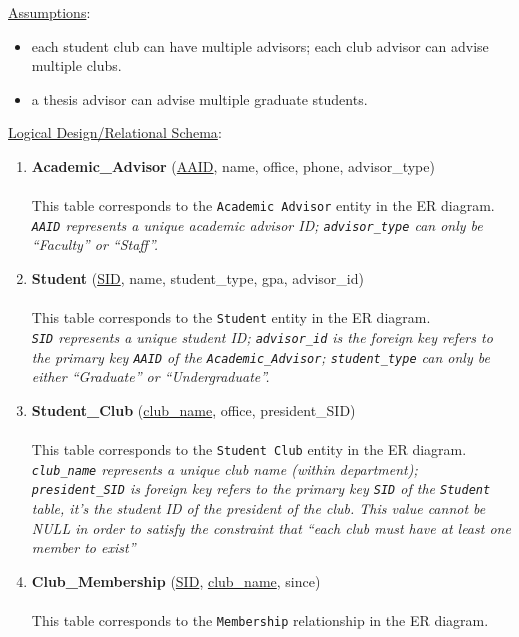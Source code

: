 \documentclass[10pt]{article}
\begin{document}
\underline{Assumptions}:
\begin{itemize}
\item each student club can have multiple advisors; each club advisor
  can advise multiple clubs.
\item a thesis advisor can advise multiple graduate students.
\end{itemize}

\vspace{1em}
\underline{Logical Design/Relational Schema}:

\begin{enumerate}
\item \textbf{Academic\_Advisor} (\underline{AAID}, name, office,
  phone, advisor\_type)\\\\
  This table corresponds to the \texttt{Academic Advisor} entity in
  the ER diagram.\\
  \emph{\texttt{AAID} represents a unique academic advisor ID;
    \texttt{advisor\_type} can only be ``Faculty'' or ``Staff''.}

\item \textbf{Student} (\underline{SID}, name, student\_type, gpa,
  advisor\_id)\\\\
  This table corresponds to the \texttt{Student} entity in the ER
  diagram.\\
  \emph{\texttt{SID} represents a unique student ID; \texttt{advisor\_id} is the
    foreign key refers to the primary key \texttt{AAID} of the
    \texttt{Academic\_Advisor}; \texttt{student\_type} can 
    only be either ``Graduate'' or ``Undergraduate''.}

\item \textbf{Student\_Club} (\underline{club\_name}, office,
  president\_SID)\\\\
  This table corresponds to the \texttt{Student Club} entity in
  the ER diagram.\\
  \emph{\texttt{club\_name} represents a unique club name (within
    department);
    \texttt{president\_SID} is foreign key refers to the primary 
  key \texttt{SID} of the \texttt{Student} table, it's the student ID
  of the president of the club. This value cannot be
  NULL in order to satisfy the constraint that ``each
  club must have at least one member to exist''}

\item \textbf{Club\_Membership} (\underline{SID},
  \underline{club\_name}, since)\\\\
  This table corresponds to the \texttt{Membership} relationship in
  the ER diagram.\\


\end{enumerate}
\end{document}
